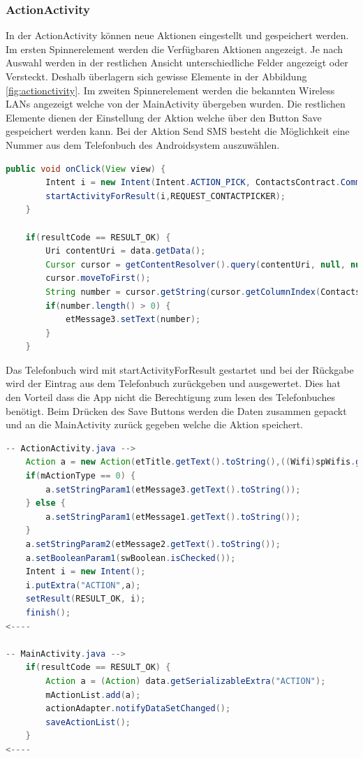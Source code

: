 \subsubsection{ActionActivity}
In der ActionActivity können neue Aktionen eingestellt und gespeichert werden. Im ersten Spinnerelement werden die Verfügbaren Aktionen angezeigt. Je nach Auswahl werden in der restlichen Ansicht unterschiedliche Felder angezeigt oder Versteckt. Deshalb überlagern sich gewisse Elemente in der Abbildung \ref{fig:actionctivity}. Im zweiten Spinnerelement werden die bekannten Wireless LANs angezeigt welche von der MainActivity übergeben wurden. Die restlichen Elemente dienen der Einstellung der Aktion welche über den Button \glqq Save\grqq{} gespeichert werden kann. Bei der Aktion Send SMS besteht die Möglichkeit eine Nummer aus dem Telefonbuch des Androidsystem auszuwählen.
\begin{lstlisting}[language=Java]
    public void onClick(View view) {
        Intent i = new Intent(Intent.ACTION_PICK, ContactsContract.CommonDataKinds.Phone.CONTENT_URI);
        startActivityForResult(i,REQUEST_CONTACTPICKER);
    }

    if(resultCode == RESULT_OK) {
        Uri contentUri = data.getData();
        Cursor cursor = getContentResolver().query(contentUri, null, null, null, null);
        cursor.moveToFirst();
        String number = cursor.getString(cursor.getColumnIndex(ContactsContract.CommonDataKinds.Phone.NUMBER));
        if(number.length() > 0) {
            etMessage3.setText(number);
        }
    }
\end{lstlisting}
Das Telefonbuch wird mit startActivityForResult gestartet und bei der Rückgabe wird der Eintrag aus dem Telefonbuch zurückgeben und ausgewertet. Dies hat den Vorteil dass die App nicht die Berechtigung zum lesen des Telefonbuches benötigt. Beim Drücken des \glqq Save\grqq{} Buttons werden die Daten zusammen gepackt und an die MainActivity zurück gegeben welche die Aktion speichert.
\begin{lstlisting}[language=Java]
-- ActionActivity.java -->
	Action a = new Action(etTitle.getText().toString(),((Wifi)spWifis.getSelectedItem()).getSsid(), at,cbOnConnect.isChecked(),cbOnLeave.isChecked());
	if(mActionType == 0) {
	    a.setStringParam1(etMessage3.getText().toString());
	} else {
	    a.setStringParam1(etMessage1.getText().toString());
	}
	a.setStringParam2(etMessage2.getText().toString());
	a.setBooleanParam1(swBoolean.isChecked());
	Intent i = new Intent();
	i.putExtra("ACTION",a);
	setResult(RESULT_OK, i);
	finish();
<----

-- MainActivity.java -->
	if(resultCode == RESULT_OK) {
		Action a = (Action) data.getSerializableExtra("ACTION");
		mActionList.add(a);
		actionAdapter.notifyDataSetChanged();
		saveActionList();
	}
<----
\end{lstlisting}
